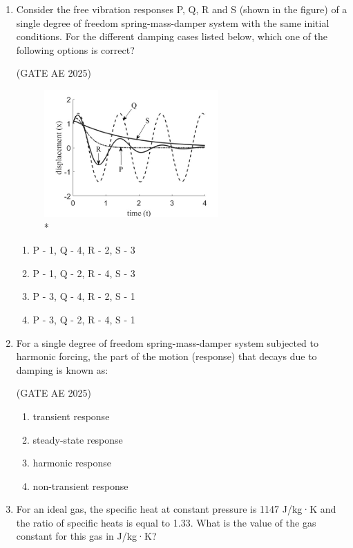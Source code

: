 \documentclass[journal,12pt,onecolumn]{IEEEtran}
\theoremstyle{remark}
\begin{document}
\begin{flushleft}
\begin{enumerate}
\item Consider the free vibration responses P, Q, R and S (shown in the figure) of a single degree of freedom spring-mass-damper system with the same initial conditions. For the different damping cases listed below, which one of the following options is correct? 

\hfill (GATE AE 2025)

\begin{figure}[H]
\includegraphics[width=0.5\columnwidth]{figs/xt.png}
\caption{*}
    \label{fig:placeholder}
\end{figure}


\begin{enumerate}
    \item P - 1, Q - 4, R - 2, S - 3
    \item P - 1, Q - 2, R - 4, S - 3
    \item P - 3, Q - 4, R - 2, S - 1
    \item P - 3, Q - 2, R - 4, S - 1
\end{enumerate}

\item For a single degree of freedom spring-mass-damper system subjected to harmonic forcing, the part of the motion (response) that decays due to damping is known as:

\hfill (GATE AE 2025)

 \begin{enumerate}
    \item transient response
    \item steady-state response
    \item harmonic response
    \item non-transient response
 \end{enumerate}   


\item For an ideal gas, the specific heat at constant pressure is 1147 J/kg·K and the ratio of specific heats is equal to 1.33. What is the value of the gas constant for this gas in J/kg·K? 


\end{enumerate}
\end{flushleft}
\end{document}
